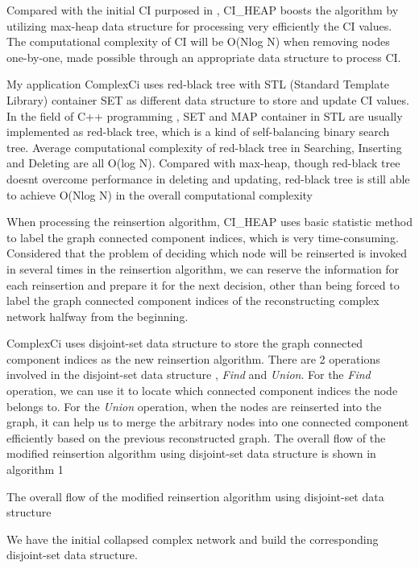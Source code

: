 \documentclass{article}
\begin{document}
	\begin{enumerate}
	\begin{item}
		Compared with the initial CI purposed in \cite{morone2015influence}, CI\_HEAP boosts the algorithm by utilizing max-heap data structure for processing very efficiently the CI values. The computational complexity of CI will be O(Nlog N) when removing nodes one-by-one, made possible through an appropriate data structure to process CI. 
		
		My application ComplexCi uses red-black tree with STL (Standard Template Library) container SET as different data structure to store and update CI values. In the field of C++ programming , SET and MAP container in STL are usually implemented as red-black tree, which is a kind of self-balancing binary search tree. Average computational complexity of red-black tree in Searching, Inserting and Deleting are all O(log N). Compared with max-heap, though red-black tree doesn\textquotesingle t overcome performance in deleting and updating, red-black tree is still able to achieve O(Nlog N) in the overall computational complexity 
	\end{item}
	\begin{item}
		When processing the reinsertion algorithm, CI\_HEAP uses basic statistic method to label the graph connected component indices, which is very time-consuming. Considered that the problem of deciding which node will be reinserted is invoked in several times in the reinsertion algorithm, we can reserve the information for each reinsertion and prepare it for the next decision, other than being forced to label the graph connected component indices of the reconstructing complex network halfway from the beginning.
		
		ComplexCi uses disjoint-set data structure to store the graph connected component indices as the new reinsertion algorithm. There are 2 operations involved in the disjoint-set data structure , \textit{Find} and \textit{Union}. For the \textit{Find} operation, we can use it to locate which connected component indices the node belongs to. For the \textit{Union} operation, when the nodes are reinserted into the graph, it can help us to merge the arbitrary nodes into one connected component efficiently based on the previous reconstructed graph. The overall flow of the modified reinsertion algorithm using disjoint-set data structure is shown in algorithm 1

		\begin{algorithm}[htb]
		\caption{ The overall flow of the modified reinsertion algorithm using disjoint-set data structure }
		\begin{algorithmic}[1]
			\State We have the initial collapsed complex network and build the corresponding disjoint-set data structure.
			

\end{algorithmic}
\end{algorithm}
\end{item}
\end{enumerate}
\end{document}
